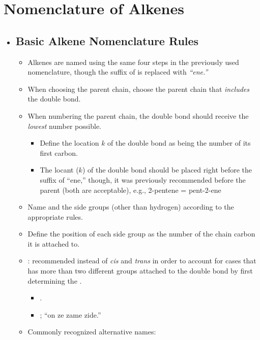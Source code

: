 \clearpage
\section{Nomenclature of Alkenes}\label{Nomenclature of Alkenes}
\begin{itemize}
  \item[]

  \subsection{Basic Alkene Nomenclature Rules}\label{Basic Alkene Nomenclature Rules}
  \begin{itemize}
    \item Alkenes are named using the same four steps in the previously used nomenclature, though the suffix of  is replaced with \emph{``ene.''}
    \item When choosing the parent chain, choose the parent chain that \emph{includes} the double bond.
    \item When numbering the parent chain, the double bond should receive the \emph{lowest} number possible.
      \begin{itemize}
        \item Define the location \(k\) of the double bond as being the number of its first carbon.
        \item The locant (\(k\)) of the double bond should be placed right before the suffix of ``ene,'' though, it was previously recommended before the parent (both are acceptable), e.g., 2-pentene = pent-2-ene
      \end{itemize}
    \item Name and the side groups (other than hydrogen) according to the appropriate rules.
    \item Define the position of each side group as the number of the chain carbon it is attached to.
    \item {}: recommended instead of \textit{cis} and \textit{trans} in order to account for cases that has more than two different groups attached to the double bond by first determining the \hyperref[Cahn-Ingold-Prelog System]{}. 
      \begin{itemize}
        \item {}.
        \item {}; ``on ze zame zide.''
      \end{itemize}
    \item Commonly recognized alternative names:


\end{itemize}
\end{itemize}

